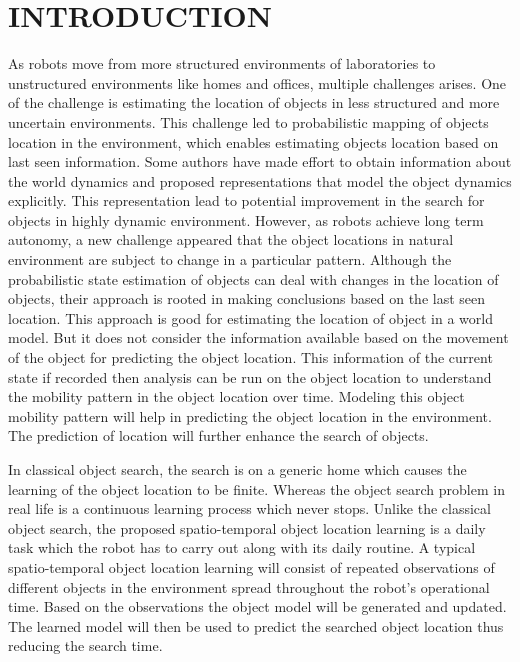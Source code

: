 
\chapter{INTRODUCTION}


As robots move from more structured environments of laboratories to
unstructured environments like homes and offices, multiple challenges arises. One
of the challenge is estimating the location of objects in less structured and more
uncertain environments. This challenge led to probabilistic mapping
of objects location in the environment, which enables estimating
objects location based on last seen information. Some authors have
made effort to obtain information about the world dynamics and proposed
representations that model the object dynamics explicitly. This representation
lead to potential improvement in the search for objects in highly dynamic environment.
However, as robots achieve long term autonomy, a new challenge appeared
that the object locations in natural environment are subject to change in a
particular pattern. Although the probabilistic state estimation of objects can
deal with changes in the location of objects, their approach is rooted in
making conclusions based on the last seen location. This approach is good for
estimating the location of object in a world model. But it does not consider the
information available based on the movement of the object for predicting the
object location. This information of the current state if recorded then analysis
can be run on the object location to understand the mobility pattern in the
object location over time. Modeling this object mobility pattern will help in
predicting the object location in the environment. The prediction of location
will further enhance the search of objects. 

In classical object search, the search is on a generic home which causes the learning of the object location to be finite. Whereas the object search problem in real life is a continuous learning process which
never stops. Unlike the classical object search,  the proposed spatio-temporal object location learning is a daily
task which the robot has to carry out along with its daily routine. A typical
spatio-temporal object location learning will consist of repeated observations
of different objects in the environment spread throughout the robot's
operational time. Based on the observations the object model will be generated and updated. The learned model will then be used to predict the searched object location thus reducing the search time.

